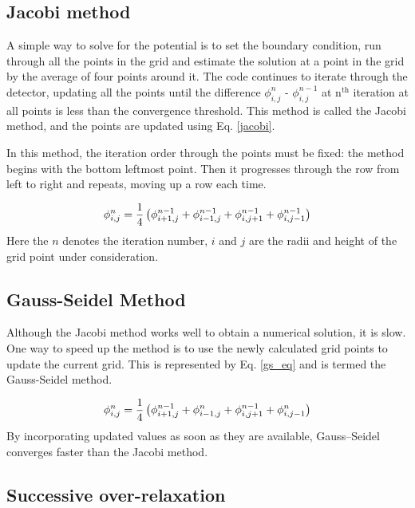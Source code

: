 \subsection*{Jacobi method}
A simple way to solve for the potential is to set the boundary condition, run through all the points in the grid and estimate the solution at a point in the grid by the average of four points around it. The code continues to iterate through the detector, updating all the points until the difference $\phi_{i,j}^{n}$ - $\phi_{i,j}^{n-1}$ at n$^{\text{th}}$ iteration at all points is less than the convergence threshold. This method is called the Jacobi method, and the points are updated using Eq. \ref{jacobi}.

In this method, the iteration order through the points must be fixed: the method begins with the bottom leftmost point. Then it progresses through the row from left to right and repeats, moving up a row each time.


\begin{equation}{\label{jacobi}}
 \phi_{i,j}^{n} = \frac{1}{4}  \left(\phi^{n-1}_{i+1,j} + \phi^{n-1}_{i-1,j} + \phi^{n-1}_{i,j+1} + \phi^{n-1}_{i,j-1} \right)
\end{equation}
Here the $n$ denotes the iteration number, $i$ and $j$ are the radii and height of the grid point under consideration. 

\subsection*{Gauss-Seidel Method}

Although the Jacobi method works well to obtain a numerical solution, it is slow. One way to speed up the method is to use the newly calculated grid points to update the current grid. This is represented by Eq. \ref{gs_eq} and is termed the Gauss-Seidel method.


\begin{equation}{\label{gs_eq}}
 \phi_{i,j}^{n} = \frac{1}{4}  \left(\phi^{n-1}_{i+1,j} + \phi^n_{i-1,j} + \phi^{n-1}_{i,j+1} + \phi^n_{i,j-1} \right)
\end{equation}
By incorporating updated values as soon as they are available, Gauss--Seidel converges faster than the Jacobi method.

\subsection*{Successive over-relaxation}

